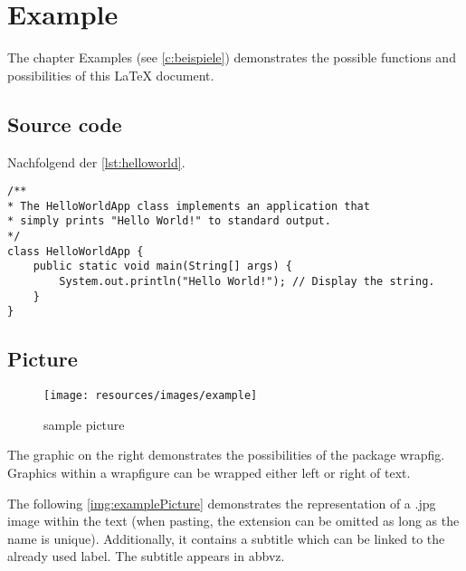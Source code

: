 \chapter{Example} \label{c:beispiele}

The chapter Examples (see \autoref{c:beispiele}) demonstrates the possible functions and possibilities of this LaTeX document.


\section{Source code}

Nachfolgend der \autoref{lst:helloworld}.

\begin{lstlisting}[caption={Hello World}, captionpos=b, label={lst:helloworld}]
/**
* The HelloWorldApp class implements an application that
* simply prints "Hello World!" to standard output.
*/
class HelloWorldApp {
	public static void main(String[] args) {
		System.out.println("Hello World!"); // Display the string.
	}
}
\end{lstlisting}



\section{Picture}

\begin{wrapfigure}{R}{0.5\textwidth}
	\centering
	\texttt{[image: resources/images/example]}
	\caption{sample picture {\cite{PEXELS2015}}}
\end{wrapfigure}

The graphic on the right demonstrates the possibilities of the package \glqq wrapfig\grqq . Graphics within a \glqq wrapfigure\grqq{} can be wrapped either left or right of text.

The following \autoref{img:examplePicture} demonstrates the representation of a \glqq *.jpg\grqq{} image within the text (when pasting, the extension can be omitted as long as the name is unique). Additionally, it contains a subtitle which can be linked to the already used label. The subtitle appears in \gls{abbvz}.


